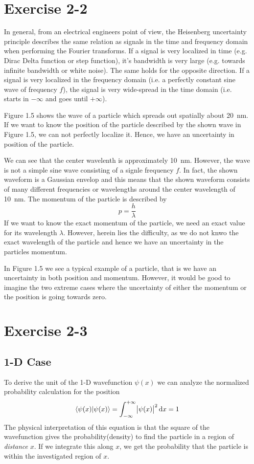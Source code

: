 \newpage
\section{Exercise 2-2}
In general, from an electrical engineers point of view, the Heisenberg
uncertainty principle describes the same relation as signals in the time and
frequency domain when performing the Fourier transforms. If a signal is very
localized in time (e.g. Dirac Delta function or step function), it's
bandwidth is very large (e.g. towards infinite bandwidth or white noise).
The same holds for the opposite direction. If a signal is very localized in
the frequency domain (i.e. a perfectly constant sine wave of frequency $f$),
the signal is very wide-spread in the time domain (i.e. starts in
$-\infty$ and goes until $+\infty$).

Figure 1.5 shows the wave of a particle which spreads out spatially about
\SI{20}{\nano\meter}. If we want to know the position of the particle
described by the shown wave in Figure 1.5, we can not perfectly localize
it. Hence, we have an uncertainty in position of the particle.

We can see that the center wavelenth is approximately \SI{10}{\nano\meter}.
However, the wave is not a simple sine wave consisting of a signle frequency
$f$. In fact, the shown waveform is a Gaussian envelop and this means that
the shown waveform consists of many different frequencies or wavelengths
around the center wavelength of \SI{10}{\nano\meter}. The momentum of the
particle is described by
\[
	p = \frac{h}{\lambda}
\]
If we want to know the exact momentum of the particle, we need an exact
value for its wavelength $\lambda$. However, herein lies the difficulty,
as we do not knwo the exact wavelength of the particle and hence we
have an uncertainty in the particles momentum.

In Figure 1.5 we see a typical example of a particle, that is we have an
uncertainty in both position and momentum. However, it would be good to
imagine the two extreme cases where the uncertainty of either the momentum
or the position is going towards zero.

\newpage
\section{Exercise 2-3}

\subsection{1-D Case}
To derive the unit of the 1-D wavefunction $\psi(x)$ we can analyze the
normalized probability calculation for the position
\[
	\braket{\psi(x)|\psi(x)}
	= \int_{-\infty}^{+\infty}{\abs{\psi(x)}^2} \dif x
	= 1
\]
The physical interpretation of this equation is that the square of the 
wavefunction gives the probability(density) to find the particle in a
region of \emph{distance} $x$. If we integrate this along $x$, we get
the probability that the particle is within the investigated region of $x$.

